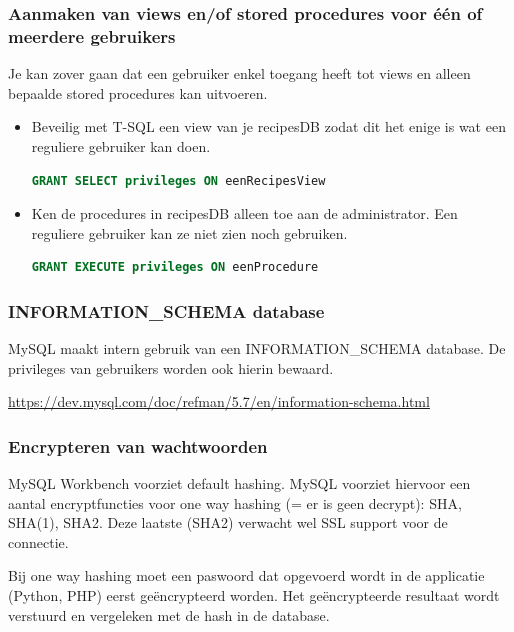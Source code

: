 \documentclass{article}
\begin{document}
\subsubsection{Aanmaken van views en/of stored procedures voor één of meerdere gebruikers}

Je kan zover gaan dat een gebruiker enkel toegang heeft tot views en alleen bepaalde stored procedures kan uitvoeren.

\begin{itemize}
    \item Beveilig met T-SQL een view van je recipesDB zodat dit het enige is wat een reguliere gebruiker kan doen.

    \begin{lstlisting}[language=SQL]
    GRANT SELECT privileges ON eenRecipesView
    \end{lstlisting}

    \item Ken de procedures in recipesDB alleen toe aan de administrator. Een reguliere gebruiker kan ze
    niet zien noch gebruiken.

    \begin{lstlisting}[language=SQL]
    GRANT EXECUTE privileges ON eenProcedure
    \end{lstlisting}

\end{itemize}

\subsubsection{INFORMATION\_SCHEMA database}
MySQL maakt intern gebruik van een INFORMATION\_SCHEMA database. De privileges van gebruikers
worden ook hierin bewaard.

\url{https://dev.mysql.com/doc/refman/5.7/en/information-schema.html}

\subsubsection{Encrypteren van wachtwoorden}

MySQL Workbench voorziet default hashing. MySQL voorziet hiervoor een aantal encryptfuncties voor one way hashing (= er is
geen decrypt): SHA, SHA(1), SHA2. Deze laatste (SHA2) verwacht wel SSL support voor de connectie.

Bij one way hashing moet een paswoord dat opgevoerd wordt in de applicatie (Python, PHP) eerst
geëncrypteerd worden. Het geëncrypteerde resultaat wordt verstuurd en vergeleken met de hash in de
database.
\end{document}
